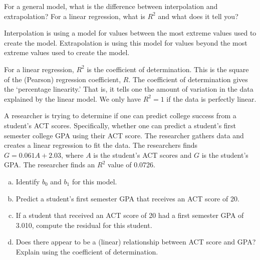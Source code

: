 \documentclass[11pt,letterpaper]{article}
\begin{document}

 For a general model, what is the difference between interpolation and extrapolation? For a linear regression, what is $R^2$ and what does it tell you? \pspace

\sol Interpolation is using a model for values between the most extreme values used to create the model. Extrapolation is using this model for values beyond the most extreme values used to create the model. \pspace

For a linear regression, $R^2$ is the coefficient of determination. This is the square of the (Pearson) regression coefficient, $R$. The coefficient of determination gives the `percentage linearity.' That is, it tells one the amount of variation in the data explained by the linear model. We only have $R^2= 1$ if the data is perfectly linear. 



\newpage



 A researcher is trying to determine if one can predict college success from a student's ACT scores. Specifically, whether one can predict a student's first semester college GPA using their ACT score. The researcher gathers data and creates a linear regression to fit the data. The researchers finds $G= 0.061A + 2.03$, where $A$ is the student's ACT scores and $G$ is the student's GPA. The researcher finds an $R^2$ value of 0.0726. 
	\begin{enumerate}[(a)]
	\item Identify $b_0$ and $b_1$ for this model.
	\item Predict a student's first semester GPA that receives an ACT score of 20. 
	\item If a student that received an ACT score of 20 had a first semester GPA of 3.010, compute the residual for this student. 
	\item Does there appear to be a (linear) relationship between ACT score and GPA? Explain using the coefficient of determination. 
	\end{enumerate} \pspace
\end{document}

